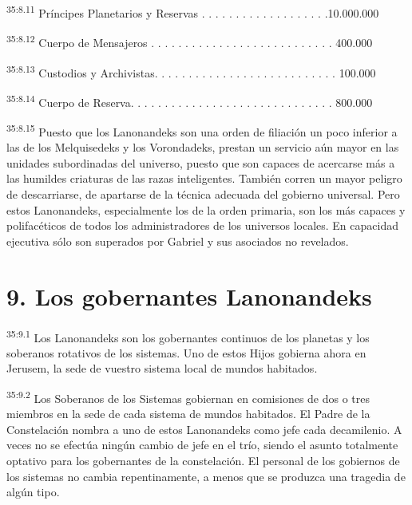 \par
\textsuperscript{35:8.11} Príncipes Planetarios y Reservas . . . . . . . . . . . . . . .
. . . .10.000.000

\par
\textsuperscript{35:8.12} Cuerpo de Mensajeros . . . . . . . . . . . . . . . . . . . . . .
. . . . . 400.000

\par
\textsuperscript{35:8.13} Custodios y Archivistas. . . . . . . . . . . . . . . . . . . . .
. . . . . . 100.000

\par
\textsuperscript{35:8.14} Cuerpo de Reserva. . . . . . . . . . . . . . . . . . . . . . . .
. . . . . . 800.000

\par
\textsuperscript{35:8.15} Puesto que los Lanonandeks son una orden de filiación un poco inferior a las de los Melquisedeks y los Vorondadeks, prestan un servicio aún mayor en las unidades subordinadas del universo, puesto que son capaces de acercarse más a las humildes criaturas de las razas inteligentes. También corren un mayor peligro de descarriarse, de apartarse de la técnica adecuada del gobierno universal. Pero estos Lanonandeks, especialmente los de la orden primaria, son los más capaces y polifacéticos de todos los administradores de los universos locales. En capacidad ejecutiva sólo son superados por Gabriel y sus asociados no revelados.

\section*{9. Los gobernantes Lanonandeks}
\par
\textsuperscript{35:9.1} Los Lanonandeks son los gobernantes continuos de los planetas y los soberanos rotativos de los sistemas. Uno de estos Hijos gobierna ahora en Jerusem, la sede de vuestro sistema local de mundos habitados.

\par
\textsuperscript{35:9.2} Los Soberanos de los Sistemas gobiernan en comisiones de dos o tres miembros en la sede de cada sistema de mundos habitados. El Padre de la Constelación nombra a uno de estos Lanonandeks como jefe cada decamilenio. A veces no se efectúa ningún cambio de jefe en el trío, siendo el asunto totalmente optativo para los gobernantes de la constelación. El personal de los gobiernos de los sistemas no cambia repentinamente, a menos que se produzca una tragedia de algún tipo.

